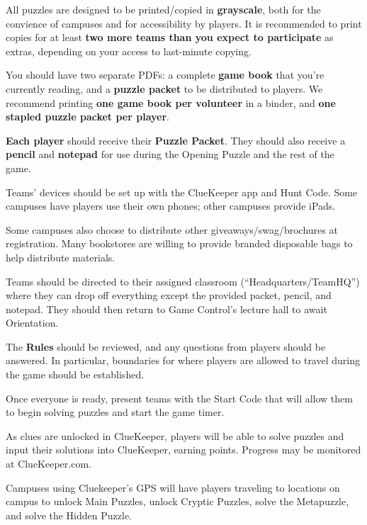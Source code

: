 
All puzzles are designed to be printed/copied in \textbf{grayscale}, both
for the convience of campuses and for accessibility by players.
It is recommended to print copies for at least
\textbf{two more teams than you expect to participate} as extras, depending
on your access to last-minute copying.

You should have two separate PDFs: a complete \textbf{game book} that you're
currently reading, and a \textbf{puzzle packet} to be distributed to players.
We recommend printing \textbf{one game book per volunteer} in a binder,
and \textbf{one stapled puzzle packet per player}. 


\textbf{Each player} should receive their \textbf{Puzzle Packet}.
They should also receive
a \textbf{pencil} and \textbf{notepad} for use during the Opening Puzzle
and the rest of the game.

Teams' devices should be set up with the ClueKeeper app and Hunt Code. Some
campuses have players use their own phones; other campuses provide
iPads.

Some campuses also choose to distribute other giveaways/swag/brochures
at registration. Many bookstores are willing to provide branded disposable
bags to help distribute materials.

Teams should be directed to their assigned classroom (``Headquarters/TeamHQ'') where they can
drop off everything except the provided packet, pencil, and notepad.
They should then return to Game Control's lecture hall to await Orientation.


The \textbf{Rules} should be reviewed, and any questions from players
should be answered. In particular, boundaries for where players are allowed
to travel during the game should be established.

Once everyone is ready, present teams with the Start Code that will allow them
to begin solving puzzles and start the game timer. 


As clues are unlocked in ClueKeeper, players will be able to solve puzzles
and input their solutions into ClueKeeper, earning points. Progress
may be monitored at ClueKeeper.com.

Campuses using Cluekeeper's GPS will have players traveling to locations
on campus to unlock Main Puzzles, unlock Cryptic Puzzles, solve the Metapuzzle,
and solve the Hidden Puzzle. 

